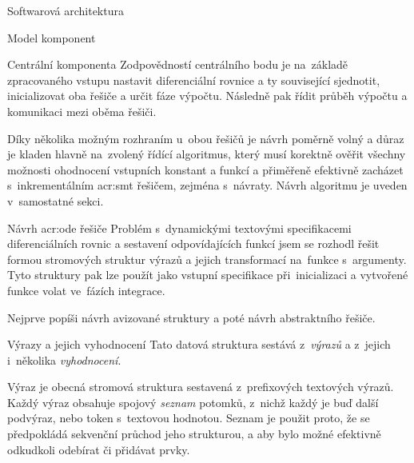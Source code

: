 \documentclass[thesis=M,czech]{FITthesis}[2012/06/26]
\newcommand{\acrlabel}[1]{acr:#1}
\newcommand{\acr}[1]{\acrshort{\acrlabel{#1}}}
\newcommand{\hl}[1]{\textit{#1}}
\newcommand{\name}[1]{\hl{#1}}
\begin{document}
\begin{section}{Softwarová architektura}
\begin{subsection}{Model komponent}

\begin{subsubsection}{Centrální komponenta}
\label{sss:design:arch:comp:center}
Zodpovědností centrálního bodu je
na~základě zpracovaného vstupu
nastavit diferenciální rovnice
a ty související sjednotit,
inicializovat oba řešiče
a určit fáze výpočtu.
Následně pak řídit
průběh výpočtu
a komunikaci mezi oběma řešiči.

Díky několika možným rozhraním u~obou řešičů
je návrh poměrně volný
a důraz je kladen hlavně na~zvolený řídící algoritmus,
který musí korektně ověřit všechny možnosti
ohodnocení vstupních konstant a funkcí
a přiměřeně efektivně zacházet
s~inkrementálním \acr{smt} řešičem, zejména s~návraty.
Návrh algoritmu je uveden v~samostatné sekci.
\end{subsubsection} %


\end{subsection} %


\begin{subsection}{Návrh \acr{ode} řešiče}\label{ss:design:arch:ode}
Problém s~dynamickými textovými specifikacemi diferenciálních rovnic
a sestavení odpovídajících funkcí
jsem se rozhodl řešit formou stromových struktur výrazů
a jejich transformací na~funkce s~argumenty.
Tyto struktury pak lze použít jako vstupní specifikace při~inicializaci
a vytvořené funkce volat ve~fázích integrace.

Nejprve popíši návrh avizované struktury
a poté návrh abstraktního řešiče.


\begin{subsubsection}{Výrazy a jejich vyhodnocení}
\label{sss:design:arch:ode:exprs}
Tato datová struktura sestává
z~\name{výrazů} a z~jejich i~několika \hl{vyhodnocení}.


\begin{paragraph}{Výraz}\label{p:design:arch:ode:exprs:expr}
je obecná stromová struktura
sestavená z~prefixových textových výrazů.
Každý výraz obsahuje spojový \hl{seznam} potomků,
z~nichž každý je buď další podvýraz,
nebo token s~textovou hodnotou.
Seznam je použit proto,
že se předpokládá sekvenční průchod jeho strukturou,
a aby bylo možné efektivně odkudkoli odebírat či přidávat prvky.


\end{paragraph}
\end{subsubsection}
\end{subsection}
\end{section}
\end{document}
